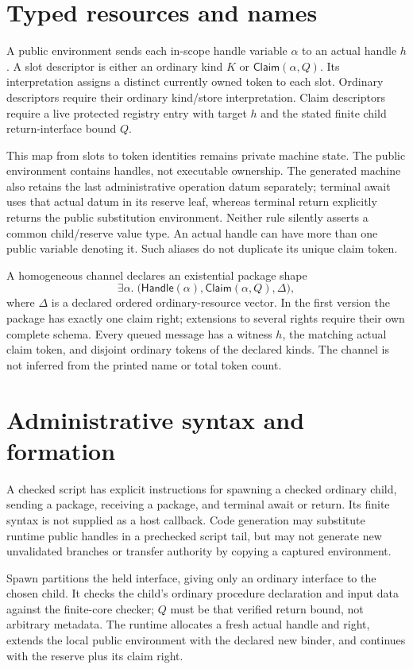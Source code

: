 \documentclass[11pt]{article}
\begin{document}
\section{Typed resources and names}
A public environment sends each in-scope handle variable $\alpha$ to an actual handle $h$. A slot descriptor is either an ordinary kind $K$ or $\mathsf{Claim}(\alpha,Q)$. Its interpretation assigns a distinct currently owned token to each slot. Ordinary descriptors require their ordinary kind/store interpretation. Claim descriptors require a live protected registry entry with target $h$ and the stated finite child return-interface bound $Q$.

This map from slots to token identities remains private machine state. The public environment contains handles, not executable ownership. The generated machine also retains the last administrative operation datum separately; terminal await uses that actual datum in its reserve leaf, whereas terminal return explicitly returns the public substitution environment. Neither rule silently asserts a common child/reserve value type. An actual handle can have more than one public variable denoting it. Such aliases do not duplicate its unique claim token.

A homogeneous channel declares an existential package shape
\[
 \exists\alpha.\;\bigl(\mathsf{Handle}(\alpha),
 \mathsf{Claim}(\alpha,Q),\Delta\bigr),
\]
where $\Delta$ is a declared ordered ordinary-resource vector. In the first version the package has exactly one claim right; extensions to several rights require their own complete schema. Every queued message has a witness $h$, the matching actual claim token, and disjoint ordinary tokens of the declared kinds. The channel is not inferred from the printed name or total token count.

\section{Administrative syntax and formation}
A checked script has explicit instructions for spawning a checked ordinary child, sending a package, receiving a package, and terminal await or return. Its finite syntax is not supplied as a host callback. Code generation may substitute runtime public handles in a prechecked script tail, but may not generate new unvalidated branches or transfer authority by copying a captured environment.

Spawn partitions the held interface, giving only an ordinary interface to the chosen child. It checks the child's ordinary procedure declaration and input data against the finite-core checker; $Q$ must be that verified return bound, not arbitrary metadata. The runtime allocates a fresh actual handle and right, extends the local public environment with the declared new binder, and continues with the reserve plus its claim right.
\end{document}
